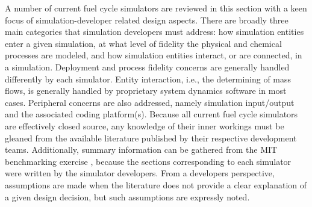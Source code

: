 A number of current fuel cycle simulators are reviewed in this section with a
keen focus of simulation-developer related design aspects. There are broadly
three main categories that simulation developers must address: how simulation
entities enter a given simulation, at what level of fidelity the physical and
chemical processes are modeled, and how simulation entities interact, or are
connected, in a simulation. Deployment and process fidelity concerns are
generally handled differently by each simulator. Entity interaction, i.e., the
determining of mass flows, is generally handled by proprietary system dynamics
software in most cases. Peripheral concerns are also addressed, namely
simulation input/output and the associated coding platform(s). Because all
current fuel cycle simulators are effectively closed source, any knowledge of
their inner workings must be gleaned from the available literature published by
their respective development teams. Additionally, summary information can be
gathered from the MIT benchmarking exercise \cite{guerin_benchmark_2009},
because the sections corresponding to each simulator were written by the
simulator developers. From a developers perspective, assumptions are made when
the literature does not provide a clear explanation of a given design decision,
but such assumptions are expressly noted.
